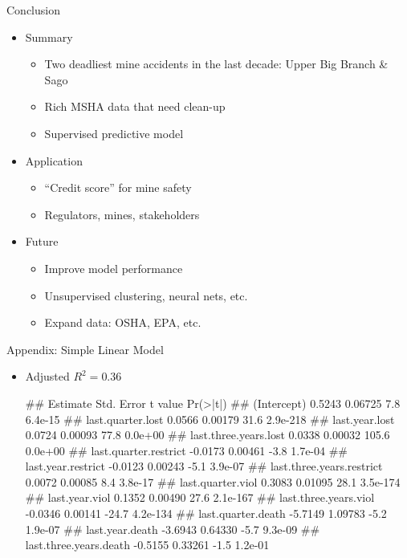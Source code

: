 \documentclass[]{beamer}
\providecommand{\tightlist}{%
  \setlength{\itemsep}{0pt}\setlength{\parskip}{0pt}}
\let\oldverbatim\verbatim
\let\endoldverbatim\endverbatim
\renewenvironment{verbatim}{\footnotesize\oldverbatim}{\endoldverbatim}
\begin{document}
\begin{frame}{Conclusion}

\begin{itemize}[<+->]
\tightlist
\item
  Summary

  \begin{itemize}[<+->]
  \tightlist
  \item
    Two deadliest mine accidents in the last decade: Upper Big Branch \&
    Sago
  \item
    Rich MSHA data that need clean-up
  \item
    Supervised predictive model
  \end{itemize}
\item
  Application

  \begin{itemize}[<+->]
  \tightlist
  \item
    ``Credit score'' for mine safety
  \item
    Regulators, mines, stakeholders
  \end{itemize}
\item
  Future

  \begin{itemize}[<+->]
  \tightlist
  \item
    Improve model performance
  \item
    Unsupervised clustering, neural nets, etc.
  \item
    Expand data: OSHA, EPA, etc.
  \end{itemize}
\end{itemize}

\end{frame}

\begin{frame}[fragile]{Appendix: Simple Linear Model}

\begin{itemize}[<+->]
\tightlist
\item
  Adjusted \(R^2=0.36\)


\begin{verbatim}
##                           Estimate Std. Error t value Pr(>|t|)
## (Intercept)                 0.5243    0.06725     7.8  6.4e-15
## last.quarter.lost           0.0566    0.00179    31.6 2.9e-218
## last.year.lost              0.0724    0.00093    77.8  0.0e+00
## last.three.years.lost       0.0338    0.00032   105.6  0.0e+00
## last.quarter.restrict      -0.0173    0.00461    -3.8  1.7e-04
## last.year.restrict         -0.0123    0.00243    -5.1  3.9e-07
## last.three.years.restrict   0.0072    0.00085     8.4  3.8e-17
## last.quarter.viol           0.3083    0.01095    28.1 3.5e-174
## last.year.viol              0.1352    0.00490    27.6 2.1e-167
## last.three.years.viol      -0.0346    0.00141   -24.7 4.2e-134
## last.quarter.death         -5.7149    1.09783    -5.2  1.9e-07
## last.year.death            -3.6943    0.64330    -5.7  9.3e-09
## last.three.years.death     -0.5155    0.33261    -1.5  1.2e-01
\end{verbatim}
\end{itemize}
\end{frame}
\end{document}
